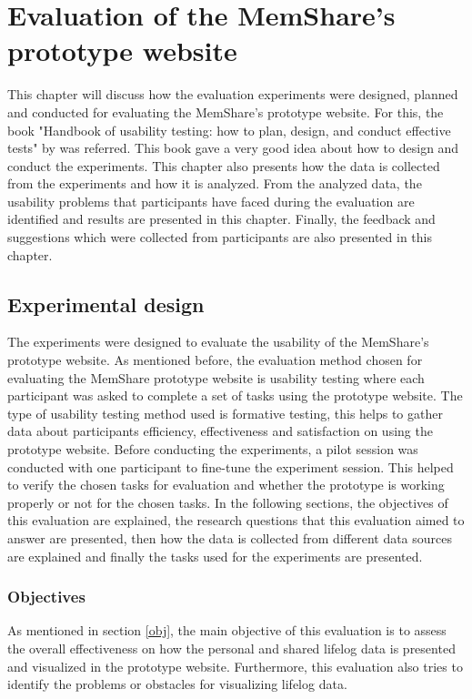\documentclass[mscthesis]{usiinfthesis}
\begin{document}
\chapter{Evaluation of the MemShare's prototype website}

This chapter will discuss how the evaluation experiments were designed, planned and conducted for evaluating the MemShare's prototype website. For this, the book "Handbook of usability testing: how to plan, design, and conduct effective tests" by \citeauthor{rubin_handbook_2008} was referred. This book gave a very good idea about how to design and conduct the experiments. This chapter also presents how the data is collected from the experiments and how it is analyzed. From the analyzed data, the usability problems that participants have faced during the evaluation are identified and results are presented in this chapter. Finally, the feedback and suggestions which were collected from participants are also presented in this chapter. 

\section{Experimental design}

The experiments were designed to evaluate the usability of the MemShare's prototype website. As mentioned before, the evaluation method chosen for evaluating the MemShare prototype website is usability testing where each participant was asked to complete a set of tasks using the prototype website. The type of usability testing method used is formative testing, this helps to gather data about participants efficiency, effectiveness and satisfaction on using the prototype website. Before conducting the experiments, a pilot session was conducted with one participant to fine-tune the experiment session. This helped to verify the chosen tasks for evaluation and whether the prototype is working properly or not for the chosen tasks. In the following sections, the objectives of this evaluation are explained, the research questions that this evaluation aimed to answer are presented, then how the data is collected from different data sources are explained and finally the tasks used for the experiments are presented.


\subsection{Objectives}
As mentioned in section \ref{obj}, the main objective of this evaluation is to assess the overall effectiveness on how the personal and shared lifelog data is presented and visualized in the prototype website. Furthermore, this evaluation also tries to identify the problems or obstacles for visualizing lifelog data.
\end{document}
